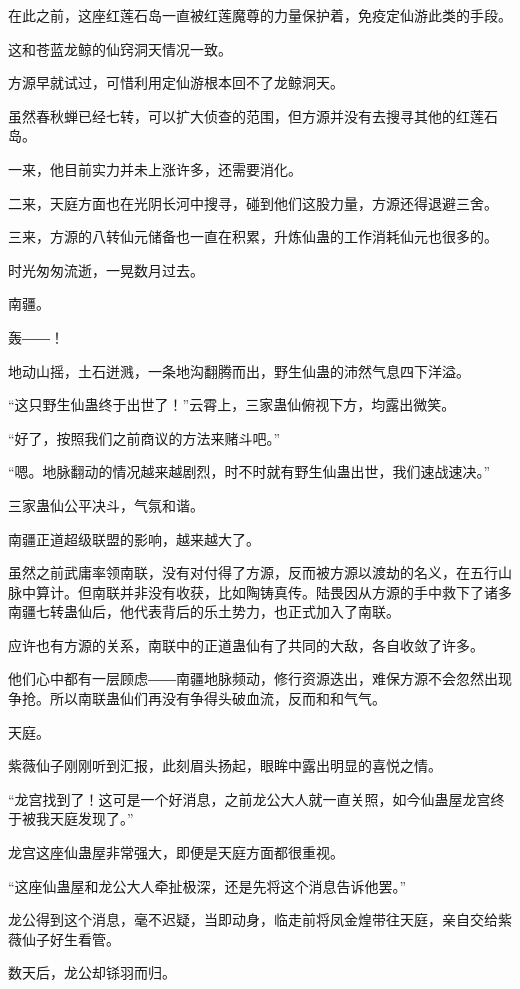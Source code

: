 \begin{this_body}
在此之前，这座红莲石岛一直被红莲魔尊的力量保护着，免疫定仙游此类的手段。

这和苍蓝龙鲸的仙窍洞天情况一致。

方源早就试过，可惜利用定仙游根本回不了龙鲸洞天。

虽然春秋蝉已经七转，可以扩大侦查的范围，但方源并没有去搜寻其他的红莲石岛。

一来，他目前实力并未上涨许多，还需要消化。

二来，天庭方面也在光阴长河中搜寻，碰到他们这股力量，方源还得退避三舍。

三来，方源的八转仙元储备也一直在积累，升炼仙蛊的工作消耗仙元也很多的。

时光匆匆流逝，一晃数月过去。

南疆。

轰――！

地动山摇，土石迸溅，一条地沟翻腾而出，野生仙蛊的沛然气息四下洋溢。

“这只野生仙蛊终于出世了！”云霄上，三家蛊仙俯视下方，均露出微笑。

“好了，按照我们之前商议的方法来赌斗吧。”

“嗯。地脉翻动的情况越来越剧烈，时不时就有野生仙蛊出世，我们速战速决。”

三家蛊仙公平决斗，气氛和谐。

南疆正道超级联盟的影响，越来越大了。

虽然之前武庸率领南联，没有对付得了方源，反而被方源以渡劫的名义，在五行山脉中算计。但南联并非没有收获，比如陶铸真传。陆畏因从方源的手中救下了诸多南疆七转蛊仙后，他代表背后的乐土势力，也正式加入了南联。

应许也有方源的关系，南联中的正道蛊仙有了共同的大敌，各自收敛了许多。

他们心中都有一层顾虑――南疆地脉频动，修行资源迭出，难保方源不会忽然出现争抢。所以南联蛊仙们再没有争得头破血流，反而和和气气。

天庭。

紫薇仙子刚刚听到汇报，此刻眉头扬起，眼眸中露出明显的喜悦之情。

“龙宫找到了！这可是一个好消息，之前龙公大人就一直关照，如今仙蛊屋龙宫终于被我天庭发现了。”

龙宫这座仙蛊屋非常强大，即便是天庭方面都很重视。

“这座仙蛊屋和龙公大人牵扯极深，还是先将这个消息告诉他罢。”

龙公得到这个消息，毫不迟疑，当即动身，临走前将凤金煌带往天庭，亲自交给紫薇仙子好生看管。

数天后，龙公却铩羽而归。


\end{this_body}
